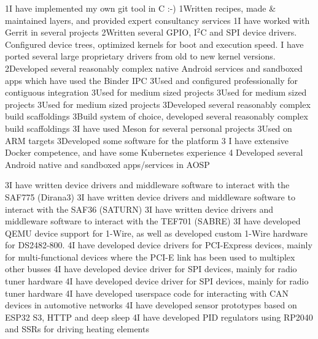 \documentclass{twocolcv}
\begin{document}
 {
                {1}{I have implemented my own git tool in C :-)}
              {1}{Written recipes, made \& maintained layers, and provided expert consultancy services}
             {1}{I have worked with Gerrit in several projects}
       {2}{Written several GPIO, I$^2$C and SPI device drivers. Configured device trees, optimized kernels for boot and execution speed. I have ported several large proprietary drivers from old to new kernel versions.}
     {2}{Developed several reasonably complex native Android services and sandboxed apps which have used the Binder IPC}
            {3}{Used and configured professionally for contiguous integration }
            {3}{Used for medium sized projects}
               {3}{Used for medium sized projects}
             {3}{Used for medium sized projects}
           {3}{Developed several reasonably complex build scaffoldings}
              {3}{Build system of choice, developed several reasonably complex build scaffoldings}
              {3}{I have used Meson for several personal projects}
             {3}{Used on ARM targets}
          {3}{Developed some software for the platform}
        {3} {I have extensive Docker competence, and have some Kubernetes experience}
       {4} {Developed several Android native and sandboxed apps/services in AOSP}
}

 {
      {3}{I have written device drivers and middleware software to interact with the SAF775 (Dirana3)}
       {3}{I have written device drivers and middleware software to interact with the SAF36 (SATURN)}
      {3}{I have written device drivers and middleware software to interact with the TEF701 (SABRE)}
     {3}{I have developed QEMU device support for 1-Wire, as well as developed custom 1-Wire hardware for DS2482-800.}
     {4}{I have developed device drivers for PCI-Express devices, mainly for multi-functional devices where the PCI-E link has been used to multiplex other busses}
             {4}{I have developed device driver for SPI devices, mainly for radio tuner hardware}
          {4}{I have developed device driver for SPI devices, mainly for radio tuner hardware}
             {4}{I have developed userspace code for interacting with CAN devices in automotive networks}
        {4}{I have developed sensor prototypes based on ESP32 S3, HTTP and deep sleep}
          {4}{I have developed PID regulators using RP2040 and SSRs for driving heating elements}
}
\end{document}
